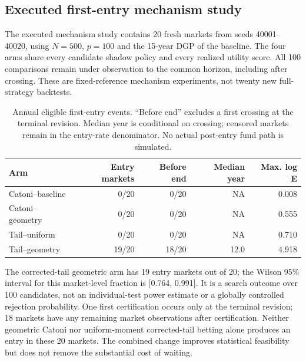\subsection{Executed first-entry mechanism study}

The executed mechanism study contains 20 fresh markets from seeds 40001--40020, using $N=500$, $p=100$ and the 15-year DGP of the baseline. The four arms share every candidate shadow policy and every realized utility score. All 100 comparisons remain under observation to the common horizon, including after crossing. These are fixed-reference mechanism experiments, not twenty new full-strategy backtests.

\begin{table}[H]\centering\small

\begin{tabular}{lrrrr}

\toprule

Arm & Entry markets & Before end & Median year & Max. log E \\

\midrule

Catoni--baseline & 0/20 & 0/20 & NA & 0.008 \\

Catoni--geometry & 0/20 & 0/20 & NA & 0.555 \\

Tail--uniform & 0/20 & 0/20 & NA & 0.710 \\

Tail--geometry & 19/20 & 18/20 & 12.0 & 4.918 \\

\bottomrule\end{tabular}

\caption{Annual eligible first-entry events. ``Before end'' excludes a first crossing at the terminal revision. Median year is conditional on crossing; censored markets remain in the entry-rate denominator. No actual post-entry fund path is simulated.}\end{table}

The corrected-tail geometric arm has 19 entry markets out of 20; the Wilson 95\% interval for this market-level fraction is [0.764, 0.991]. It is a search outcome over 100 candidates, not an individual-test power estimate or a globally controlled rejection probability. One first certification occurs only at the terminal revision; 18 markets have any remaining market observations after certification. Neither geometric Catoni nor uniform-moment corrected-tail betting alone produces an entry in these 20 markets. The combined change improves statistical feasibility but does not remove the substantial cost of waiting.

